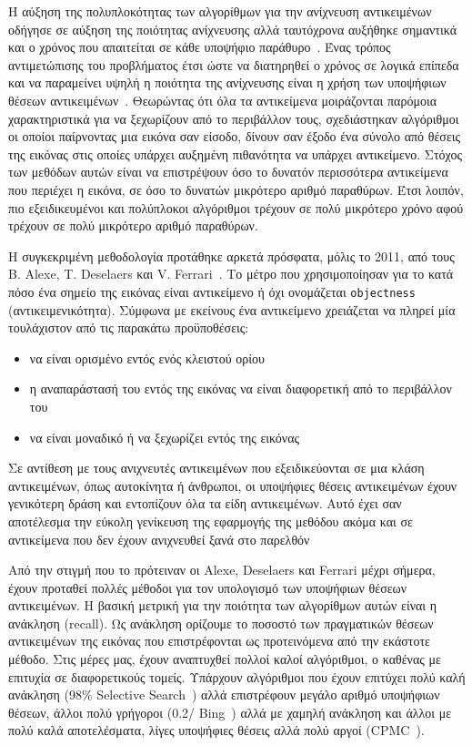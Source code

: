Η αύξηση της πολυπλοκότητας των αλγορίθμων για την ανίχνευση αντικειμένων
οδήγησε σε αύξηση της ποιότητας ανίχνευσης αλλά ταυτόχρονα αυξήθηκε σημαντικά
και ο χρόνος που απαιτείται σε κάθε υποψήφιο παράθυρο~\cite{DBLP:journals/corr/SzegedyREA14,6751480}.
Ένας τρόπος αντιμετώπισης του προβλήματος έτσι ώστε να διατηρηθεί ο χρόνος σε λογικά
επίπεδα και να παραμείνει υψηλή η ποιότητα της ανίχνευσης είναι η χρήση των
υποψήφιων θέσεων αντικειμένων~\cite{6544186, 6126456}. Θεωρώντας ότι όλα τα αντικείμενα
μοιράζονται παρόμοια χαρακτηριστικά για να ξεχωρίζουν από το περιβάλλον τους,
σχεδιάστηκαν αλγόριθμοι οι οποίοι παίρνοντας μια εικόνα σαν είσοδο, δίνουν σαν
έξοδο ένα σύνολο από θέσεις της εικόνας στις οποίες υπάρχει αυξημένη πιθανότητα
να υπάρχει αντικείμενο. Στόχος των μεθόδων αυτών είναι να επιστρέψουν
όσο το δυνατόν περισσότερα αντικείμενα που περιέχει η εικόνα, σε όσο το δυνατών
μικρότερο αριθμό παραθύρων. Έτσι λοιπόν, πιο εξειδικευμένοι και πολύπλοκοι αλγόριθμοι
τρέχουν σε πολύ μικρότερο χρόνο αφού τρέχουν σε πολύ μικρότερο αριθμό
παραθύρων.

Η συγκεκριμένη μεθοδολογία προτάθηκε αρκετά πρόσφατα, μόλις το 2011, από
τους B. Alexe, T. Deselaers και V. Ferrari~\cite{6133291}. Το μέτρο που
χρησιμοποίησαν για το κατά πόσο ένα σημείο της εικόνας είναι αντικείμενο ή όχι
ονομάζεται \texttt{objectness} (αντικειμενικότητα). Σύμφωνα με εκείνους ένα
αντικείμενο χρειάζεται να πληρεί μία τουλάχιστον από τις παρακάτω προϋποθέσεις:

\begin{itemize}
    \item να είναι ορισμένο εντός ενός κλειστού ορίου
    \item η αναπαράστασή του εντός της εικόνας να είναι διαφορετική από το περιβάλλον του
    \item να είναι μοναδικό ή να ξεχωρίζει εντός της εικόνας
\end{itemize}

Σε αντίθεση με τους ανιχνευτές αντικειμένων που εξειδικεύονται σε μια κλάση
αντικειμένων, όπως αυτοκίνητα ή άνθρωποι, οι υποψήφιες θέσεις αντικειμένων
έχουν γενικότερη δράση και εντοπίζουν όλα τα είδη αντικειμένων. Αυτό έχει σαν
αποτέλεσμα την εύκολη γενίκευση της εφαρμογής της μεθόδου ακόμα και σε αντικείμενα
που δεν έχουν ανιχνευθεί ξανά στο παρελθόν

Από την στιγμή που το πρότειναν οι Alexe, Deselaers και Ferrari μέχρι σήμερα, έχουν
προταθεί πολλές μέθοδοι για τον υπολογισμό των υποψήφιων θέσεων αντικειμένων. Η
βασική μετρική για την ποιότητα των αλγορίθμων αυτών είναι η ανάκληση (recall). Ως
ανάκληση ορίζουμε το ποσοστό των πραγματικών θέσεων αντικειμένων της εικόνας
που επιστρέφονται ως προτεινόμενα από την εκάστοτε μέθοδο.
Στις μέρες μας, έχουν αναπτυχθεί πολλοί καλοί αλγόριθμοι, ο καθένας με επιτυχία
σε διαφορετικούς τομείς. Υπάρχουν αλγόριθμοι που έχουν επιτύχει πολύ καλή
ανάκληση (98\% Selective Search~\cite{UijlingsIJCV2013}) αλλά επιστρέφουν μεγάλο αριθμό υποψήφιων
θέσεων, άλλοι πολύ γρήγοροι (0.2/ Bing~\cite{6909816}) αλλά με χαμηλή ανάκληση και άλλοι
με πολύ καλά αποτελέσματα, λίγες υποψήφιες θέσεις αλλά πολύ αργοί (CPMC~\cite{6095566}).

